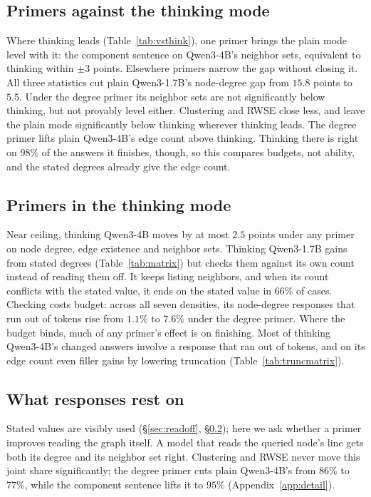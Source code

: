 \documentclass[11pt]{article}
\begin{document}
\subsection{Primers against the thinking mode}
\label{sec:vsthink}
Where thinking leads (Table~\ref{tab:vsthink}), one primer brings the plain mode level with it: the component sentence on Qwen3-4B's neighbor sets, equivalent to thinking within $\pm3$ points. Elsewhere primers narrow the gap without closing it. All three statistics cut plain Qwen3-1.7B's node-degree gap from $15.8$ points to $5.5$. Under the degree primer its neighbor sets are not significantly below thinking, but not provably level either. %
Clustering and RWSE close less, and leave the plain mode significantly below thinking wherever thinking leads. The degree primer lifts plain Qwen3-4B's edge count above thinking. Thinking there is right on $98\%$ of the answers it finishes, though, so this compares budgets, not ability, and the stated degrees already give the edge count. %

\subsection{Primers in the thinking mode}
\label{sec:thinkmode}
Near ceiling, thinking Qwen3-4B moves by at most $2.5$ points under any primer on node degree, edge existence and neighbor sets. %
Thinking Qwen3-1.7B gains from stated degrees (Table~\ref{tab:matrix}) but checks them against its own count instead of reading them off. It keeps listing neighbors, and when its count conflicts with the stated value, it ends on the stated value in $66\%$ of cases. Checking costs budget: across all seven densities, its node-degree responses that run out of tokens rise from $1.1\%$ to $7.6\%$ under the degree primer. %
Where the budget binds, much of any primer's effect is on finishing. Most of thinking Qwen3-4B's changed answers involve a response that ran out of tokens, and on its edge count even filler gains by lowering truncation (Table~\ref{tab:truncmatrix}).

\subsection{What responses rest on}
\label{sec:reston}
Stated values are visibly used (\S\ref{sec:readoff}, \S\ref{sec:thinkmode}); here we ask whether a primer improves reading the graph itself. A model that reads the queried node's line gets both its degree and its neighbor set right. Clustering and RWSE never move this joint share significantly; the degree primer cuts plain Qwen3-4B's from $86\%$ to $77\%$, while the component sentence lifts it to $95\%$ (Appendix~\ref{app:detail}). %
\end{document}
